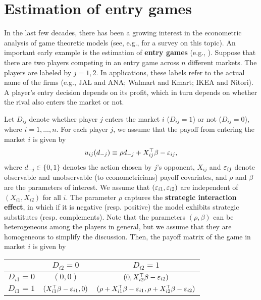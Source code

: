 \documentclass[11pt, A4paper, openany, uplatex]{book}
\begin{document}
\section{Estimation of entry games}\label{sec:games}

In the last few decades, there has been a growing interest in the econometric analysis of game theoretic models (see, e.g., \cite{de2013econometric} for a survey on this topic).
An important early example is the estimation of \textbf{entry games} (e.g., \cite{bresnahan1990entry,berry1992estimation}).
Suppose that there are two players competing in an entry game across $n$ different markets.
The players are labeled by $j = 1, 2$.
In applications, these labels refer to the actual name of the firms (e.g., JAL and ANA; Walmart and Kmart; IKEA and Nitori). 
A player's entry decision depends on its profit, which in turn depends on whether the rival also enters the market or not.

Let $D_{ij}$ denote whether player $j$ enters the market $i$ ($D_{ij} = 1$) or not ($D_{ij} = 0$), where $i = 1, \ldots, n$.
For each player $j$, we assume that the payoff from entering the market $i$ is given by
\[
	u_{ij}(d_{-j}) \equiv \rho d_{-j} + X_{ij}^\top \beta - \varepsilon_{ij},
\]
where $d_{-j}\in\{0,1\}$ denotes the action chosen by $j$'s opponent, $X_{ij}$ and $\varepsilon_{ij}$ denote observable and unobservable (to econometricians) payoff covariates, and $\rho$ and $\beta$ are the parameters of interest.
We assume that $(\varepsilon_{i1}, \varepsilon_{i2})$ are independent of $(X_{i1}, X_{i2})$ for all $i$.
The parameter $\rho$ captures the \textbf{strategic interaction effect}, in which if it is negative (resp. positive) the model exhibits strategic substitutes (resp. complements).
Note that the parameters $(\rho, \beta)$ can be heterogeneous among the players in general, but we assume that they are homogeneous to simplify the discussion.
Then, the payoff matrix of the game in market $i$ is given by
\begin{center}
\begin{tabular}{c|c|c}
	\hline
	             & $D_{i2} = 0$ & $D_{i2} = 1$ \\ \hline
	$D_{i1} = 0$ & $(0, 0)$     & $(0, X_{i2}^\top \beta - \varepsilon_{i2})$ \\ \hline 
	$D_{i1} = 1$ & $(X_{i1}^\top \beta - \varepsilon_{i1}, 0)$ & $(\rho + X_{i1}^\top \beta - \varepsilon_{i1}, \rho + X_{i2}^\top \beta - \varepsilon_{i2})$\\ \hline
\end{tabular}
\end{center}
\end{document}
